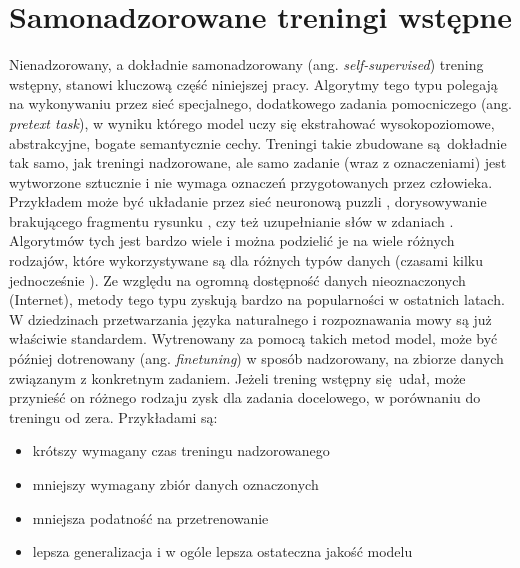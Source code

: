 \section{Samonadzorowane treningi wstępne}

Nienadzorowany, a dokładnie samonadzorowany (ang. \emph{self-supervised}) trening wstępny, stanowi kluczową część niniejszej pracy. Algorytmy tego typu polegają na wykonywaniu przez sieć specjalnego, dodatkowego zadania pomocniczego (ang. \emph{pretext task}), w wyniku którego model uczy się ekstrahować wysokopoziomowe, abstrakcyjne, bogate semantycznie cechy. Treningi takie zbudowane są dokładnie tak samo, jak treningi nadzorowane, ale samo zadanie (wraz z oznaczeniami) jest wytworzone sztucznie i nie wymaga oznaczeń przygotowanych przez człowieka. Przykładem może być układanie przez sieć neuronową puzzli \cite{noroozi_unsupervised_2017}, dorysowywanie brakującego fragmentu rysunku \cite{pathak_context_2016}, czy też uzupełnianie słów w zdaniach \cite{devlin_bert_2019}. Algorytmów tych jest bardzo wiele i można podzielić je na wiele różnych rodzajów, które wykorzystywane są dla różnych typów danych (czasami kilku jednocześnie \cite{jia_scaling_2021}). Ze względu na ogromną dostępność danych nieoznaczonych (Internet), metody tego typu zyskują bardzo na popularności w ostatnich latach. W dziedzinach przetwarzania języka naturalnego i rozpoznawania mowy są już właściwie standardem. Wytrenowany za pomocą takich metod model, może być później dotrenowany (ang. \emph{finetuning}) w sposób nadzorowany, na zbiorze danych związanym z konkretnym zadaniem. Jeżeli trening wstępny się udał, może przynieść on różnego rodzaju zysk dla zadania docelowego, w porównaniu do treningu od zera. Przykładami są:
\begin{itemize}
    \item krótszy wymagany czas treningu nadzorowanego
    \item mniejszy wymagany zbiór danych oznaczonych
    \item mniejsza podatność na przetrenowanie
    \item lepsza generalizacja i w ogóle lepsza ostateczna jakość modelu
\end{itemize}

